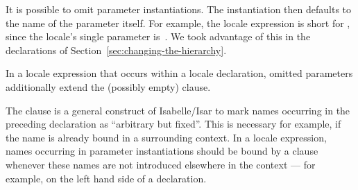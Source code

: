 \begin{isabellebody}
\begin{isamarkuptext}
It is possible to omit parameter instantiations.  The
  instantiation then defaults to the name of
  the parameter itself.  For example, the locale expression  is short for , since the
  locale's single parameter is~.  We took advantage of this
  in the  declarations of
  Section~\ref{sec:changing-the-hierarchy}.%
\end{isamarkuptext}%
\isamarkuptrue%
%
\isamarkuptrue%
%
\begin{isamarkuptext}%
In a locale expression that occurs within a locale
  declaration, omitted parameters additionally extend the (possibly
  empty)  clause.

  The  clause is a general construct of Isabelle/Isar
  to mark names occurring in the preceding declaration as ``arbitrary
  but fixed''.  This is necessary for example, if the name is already
  bound in a surrounding context.  In a locale expression, names
  occurring in parameter instantiations should be bound by a
   clause whenever these names are not introduced
  elsewhere in the context --- for example, on the left hand side of a
   declaration.


\end{isamarkuptext}
\end{isabellebody}
